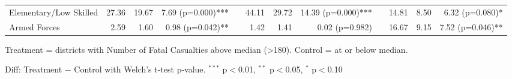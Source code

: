 \begin{table}[htbp]
\begin{tabular}{l rrr c rrr c rrr}
\quad Elementary/Low Skilled & 27.36 & 19.67 & 7.69 (p=0.000)*** &  & 44.11 & 29.72 & 14.39 (p=0.000)*** &  & 14.81 & 8.50 & 6.32 (p=0.080)* \\
\quad Armed Forces & 2.59 & 1.60 & 0.98 (p=0.042)** &  & 1.42 & 1.41 & 0.02 (p=0.982) &  & 16.67 & 9.15 & 7.52 (p=0.046)** \\
\bottomrule
\end{tabular}
\begin{tablenotes}
\small
\item Treatment = districts with Number of Fatal Casualties above median (>180). Control = at or below median.
\item Diff: Treatment $-$ Control with Welch's t-test p-value. $^{{***}}$ p$<$0.01, $^{{**}}$ p$<$0.05, $^{{*}}$ p$<$0.10
\end{tablenotes}
\end{table}

\clearpage


